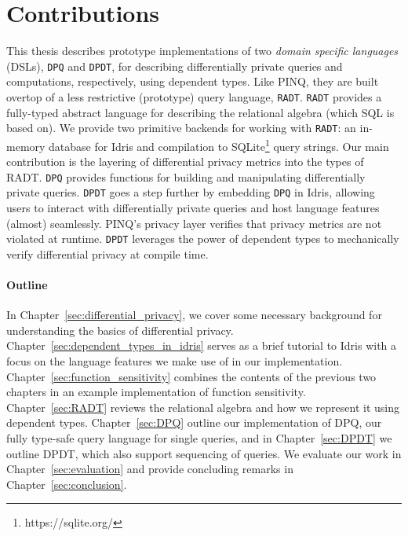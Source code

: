 \documentclass[12pt]{report}
\begin{document}
\section{Contributions}

This thesis describes prototype implementations of two \textit{domain specific languages} (DSLs), \texttt{DPQ} and \texttt{DPDT}, for describing differentially private queries and computations, respectively, using dependent types.
Like PINQ, they are built overtop of a less restrictive (prototype) query language, \texttt{RADT}.
\texttt{RADT} provides a fully-typed abstract language for describing the relational algebra (which SQL is based on).
We provide two primitive backends for working with \texttt{RADT}: an in-memory database for Idris and compilation to SQLite\footnote{https://sqlite.org/} query strings.
Our main contribution is the layering of differential privacy metrics into the types of RADT.
\texttt{DPQ} provides functions for building and manipulating differentially private queries.
\texttt{DPDT} goes a step further by embedding \texttt{DPQ} in Idris, allowing users to interact with differentially private queries and host language features (almost) seamlessly.
PINQ's privacy layer verifies that privacy metrics are not violated at runtime.
\texttt{DPDT} leverages the power of dependent types to mechanically verify differential privacy at compile time.

\paragraph{Outline}


In Chapter~\ref{sec:differential_privacy}, we cover some necessary background for understanding the basics of differential privacy.
Chapter~\ref{sec:dependent_types_in_idris} serves as a brief tutorial to Idris with a focus on the language features we make use of in our implementation.
Chapter~\ref{sec:function_sensitivity} combines the contents of the previous two chapters in an example implementation of function sensitivity.
Chapter~\ref{sec:RADT} reviews the relational algebra and how we represent it using dependent types.
Chapter~\ref{sec:DPQ} outline our implementation of DPQ, our fully type-safe query language for single queries, and in Chapter~\ref{sec:DPDT} we outline DPDT, which also support sequencing of queries. 
We evaluate our work in Chapter~\ref{sec:evaluation} and provide concluding remarks in Chapter~\ref{sec:conclusion}.
\end{document}
